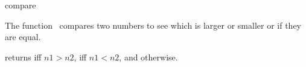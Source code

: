 \begin{ccRefFunction}{compare}

\ccDefinition

The function \ccRefName\ compares two numbers to see which is larger or
smaller or if they are equal.


{returns  iff $n1>n2$,  iff $n1<n2$, and 
otherwise.}

\end{ccRefFunction}
